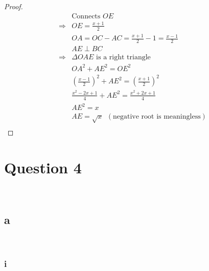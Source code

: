 \documentclass{article}
\begin{document}
\begin{proof}
    \begin{align*}
        &\text{Connects }OE\\
        \Rightarrow&OE=\frac{x+1}{2}\\
        &OA=OC-AC=\frac{x+1}{2}-1=\frac{x-1}{2}\\
        &AE\perp BC\\
        \Rightarrow&\Delta OAE \text{ is a right triangle}\\
        &OA^2+AE^2=OE^2\\
        &\left(\frac{x-1}{2}\right)^2+AE^2=\left(\frac{x+1}{2}\right)^2\\
        &\frac{x^2-2x+1}{4}+AE^2=\frac{x^2+2x+1}{4}\\
        &AE^2=x\\
        &AE=\sqrt{x}\ \ (\text{negative root is meaningless})\\
    \end{align*}
\end{proof}

\newpage

\section*{Question 4}

~

\subsection*{a}

~

\subsubsection*{i}

~
\end{document}
